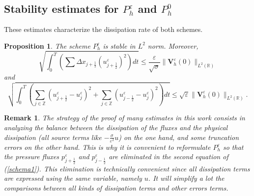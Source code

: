 \documentclass[a4paper,french,english,10pt]{article}
\newcommand\eps{\varepsilon}
\newcommand\V{\mathbf{V}}
\newtheorem{proposition}[theorem]{Proposition}
\newtheorem{remark}[theorem]{Remark}
\begin{document}
 \subsection{Stability  estimates for $P_h^\varepsilon$ and $P_h^0$}

These estimates characterize the dissipation rate 
of both schemes.

\begin{proposition}\label{prodentrgosse}
The  scheme $P_h^\eps$
is stable in $L^2$ norm. Moreover, 
\begin{equation}\label{estiuepsflux}
\sqrt{
\int_0^T \left( \sum \Delta x_{j+\frac12}  ( u_{j+\frac12 }^\eps)^2 \right)dt
}
\leq
\frac{\eps}{\sqrt{\sigma}}
 \|\V^{\eps}_h(0)\|_{L^2(\mathbb{R})}
\end{equation}
and
\begin{equation}\label{estiuepsflux2}
 \sqrt{
\int_0^T
\left(
\sum_{j\in \mathbb{Z}} 
{
(u_{j+\frac12 }^{\eps}-u^{\eps}_j)^2 }
 +\sum_{j\in \mathbb{Z}} 
{
(u_{j-\frac12 }^{\eps}-u^{\eps}_j)^2 }
\right)dt }
\leq \sqrt \eps  \|\V^{\eps}_h(0)\|_{L^2(\mathbb{R})}.
\end{equation}
\end{proposition}
\begin{remark}
The strategy of the proof of many estimates in this work
consists in analyzing the balance
between the dissipation of the fluxes and the physical dissipation (all 
 source terms like 
$-\frac\sigma{\eps^2}u$) on the one hand, and some truncation errors
on the other hand.
This is why it is  convenient
to reformulate $P_h^\eps$
so that   the pressure fluxes 
$p_{j+\frac12 }^{\eps}$ and $p_{j-\frac12 }^{\eps}$ are eliminated in the second
equation of (\ref{schema1}). This elimination is technically convenient since
all dissipation terms are expressed using the same variable, namely $u$.
It will simplify a lot the comparisons between
all kinds of dissipation terms and other errors terms.
\end{remark}
\end{document}
